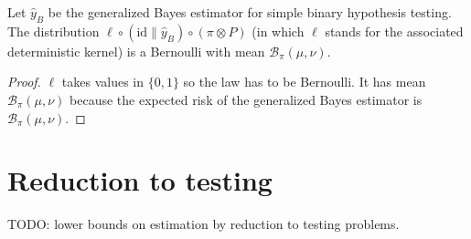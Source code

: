 \begin{lemma}
  \label{lem:bayesBinaryRisk_bernoulli}
  Let $\hat{y}_B$ be the generalized Bayes estimator for simple binary hypothesis testing.
  The distribution $\ell \circ (\mathrm{id} \parallel \hat{y}_B) \circ (\pi \otimes P)$ (in which $\ell$ stands for the associated deterministic kernel) is a Bernoulli with mean $\mathcal B_\pi(\mu, \nu)$.
\end{lemma}

\begin{proof}%
{}
$\ell$ takes values in $\{0,1\}$ so the law has to be Bernoulli. It has mean $\mathcal B_\pi(\mu, \nu)$ because the expected risk of the generalized Bayes estimator is $\mathcal B_\pi(\mu, \nu)$.
\end{proof}



\section{Reduction to testing}

TODO: lower bounds on estimation by reduction to testing problems.